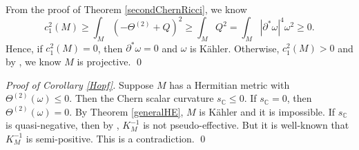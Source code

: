\documentclass[12pt]{amsart}
\theoremstyle{plain}
\theoremstyle{definition}
\newcommand{\p}{\partial}
\newcommand{\beq}{\begin{equation}}
\newcommand{\eeq}{\end{equation}}
\renewcommand{\>}{\rightarrow}
\newcommand{\C}{{\mathbb C}}
\numberwithin{equation}{section} %
\begin{document}
		 From the proof of Theorem \ref{secondChernRicci}, we know 
		 \beq c^2_1(M)\geq \int_M \left( -\Theta^{(2)}+Q\right)^2\geq \int_M Q^2= \int_M |\p^*\omega|^4\omega^2\geq 0. \eeq 
		Hence, if $c_1^2(M)=0$, then $\p^*\omega=0$ and $\omega$ is K\"ahler.  Otherwise, $c^2_1(M)>0$ and by \cite[Theorem~9]{Kodaira1964}, we know $M$ is projective. \qed 
		
		
		\baselineskip
	
	
	
	\noindent \emph{Proof of Corollary \ref{Hopf}.} Suppose $M$ has a Hermitian metric with $\Theta^{(2)}(\omega)\leq 0$.  Then the Chern scalar curvature $s_{\mathrm{\C}}\leq 0$. If $s_{\mathrm{\C}}= 0$, then $\Theta^{(2)}(\omega)=0$. By Theorem \ref{generalHE}, $M$ is K\"ahler and it is impossible. If $s_{\mathrm{\C}}$ is quasi-negative, then by \cite[Theorem~1]{Yang2019TAMS}, $K_M^{-1}$ is not pseudo-effective. But it is well-known that $K_{M}^{-1}$ is semi-positive. This is a contradiction. \qed 
		
		
		
	\def\cprime{$'$} %
	
\end{document}
